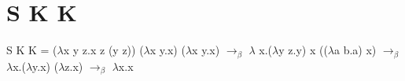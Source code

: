 \documentclass[16pt,a4paper]{scrartcl}
\begin{document}
\section{S K K}

S K K = ($\lambda$x y z.x z (y z)) ($\lambda$x y.x) ($\lambda$x y.x)
$\rightarrow_\beta$ $\lambda$ x.($\lambda$y z.y) x (($\lambda$a b.a) x)
$\rightarrow_\beta$ $\lambda$x.($\lambda$y.x) ($\lambda$z.x)
$\rightarrow_\beta$ $\lambda$x.x
\end{document}
